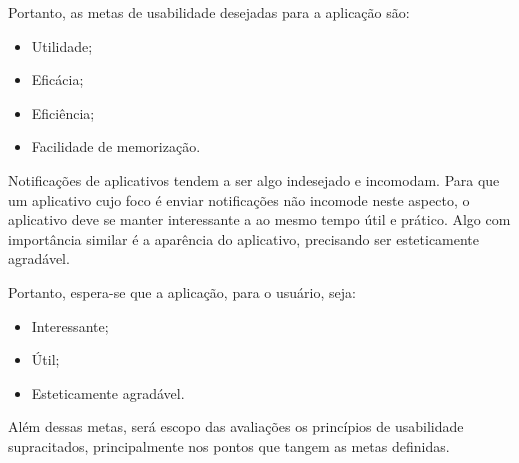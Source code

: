       Portanto, as metas de usabilidade desejadas para a aplicação são:
      
      \begin{itemize}
	\item Utilidade;
	\item Eficácia;
	\item Eficiência;
	\item Facilidade de memorização.
      \end{itemize}
          
      Notificações de aplicativos tendem a ser algo indesejado e incomodam. Para que um aplicativo cujo foco é enviar notificações
      não incomode neste aspecto, o aplicativo deve se manter interessante a ao mesmo tempo útil e prático. Algo com importância similar
      é a aparência do aplicativo, precisando ser esteticamente agradável.
      
      Portanto, espera-se que a aplicação, para o usuário, seja:
      
      \begin{itemize}
       \item Interessante;
       \item Útil;
       \item Esteticamente agradável.
      \end{itemize}
      
      Além dessas metas, será escopo das avaliações os princípios de usabilidade supracitados, principalmente nos pontos que tangem as 
      metas definidas.

      
    